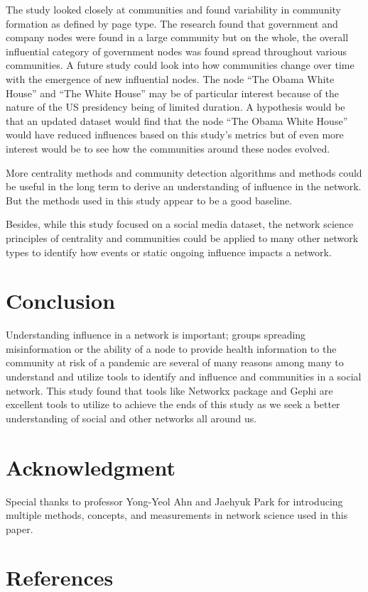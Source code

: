 \documentclass[11pt,twocolumn]{article}
\begin{document}
The study looked closely at communities and found variability in community formation as defined by page type. The research found that government and company nodes were found in a large community but on the whole, the overall influential category of government nodes was found spread throughout various communities. A future study could look into how communities change over time with the emergence of new influential nodes. The node “The Obama White House” and “The White House” may be of particular interest because of the nature of the US presidency being of limited duration. A hypothesis would be that an updated dataset would find that the node “The Obama White House” would have reduced influences based on this study's metrics but of even more interest would be to see how the communities around these nodes evolved. 
 
More centrality methods and community detection algorithms and methods could be useful in the long term to derive an understanding of influence in the network. But the methods used in this study appear to be a good baseline. 
 
Besides, while this study focused on a social media dataset, the network science principles of centrality and communities could be applied to many other network types to identify how events or static ongoing influence impacts a network.  
 



\section{Conclusion}
Understanding influence in a network is important; groups spreading misinformation or the ability of a node to provide health information to the community at risk of a pandemic are several of many reasons among many to understand and utilize tools to identify and influence and communities in a social network. This study found that tools like Networkx package and Gephi are excellent tools to utilize to achieve the ends of this study as we seek a better understanding of social and other networks all around us.

\section{Acknowledgment}
Special thanks to professor Yong-Yeol Ahn and Jaehyuk Park for introducing multiple methods, concepts, and measurements in network science used in this paper.

\section{References}
 

\end{document}
